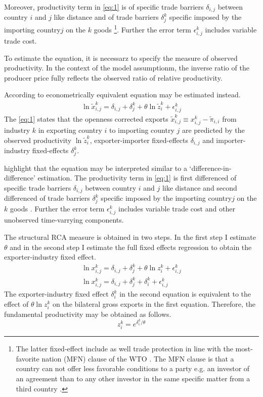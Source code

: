 Moreover, productivity term in \cref{eq:1} is  of specific trade barriers $\delta_{i,j}$ between country $i$ and $j$ like distance and  of trade barriers $\delta_j^k$ specific imposed by the importing country$j$ on the $k$ goods \footnote{The latter fixed-effect include as well  trade protection in line with the most-favorite nation (MFN) clause of the WTO \parencite{costinot}. The MFN clause is that a country can not offer less favorable conditions to a party e.g. an investor of an agreement than to any other investor in the same specific matter from a third country  \parencite{oecd-mfn}.}. Further the error term $\epsilon^k_{i,j}$ includes variable trade cost.
\par
To estimate the equation, it is necessarz to specify the measure of observed productivity.
In the context of the model assumptionm, the inverse ratio of the producer price fully reflects the observed ratio of relative productivity.
\par
According to \textcite{Costinot}  econometrically equivalent equation may be estimated instead.
  \begin{align} \label{eq:1} \ln \tilde{x}_{i,j}^k=\delta_{i,j}+\delta_j^k + \theta \ln\tilde{z}_i^k+\epsilon^k_{i,j} \end{align}
The \cref{eq:1} states that the openness corrected exports  $\tilde{x}_{i,j}^k \equiv x_{i,j}^k -  \tilde{\pi}_{i,i} $ from industry $k$ in exporting country $i$ to importing country $j$ are predicted by the observed productivity $\ln\tilde{z}_i^k$,  exporter-importer fixed-effects $\delta_{i,j}$ and importer-industry fixed-effects $\delta_j^k$. \par \textcite{costinot} highlight that the equation may be interpreted similar  to a `difference-in-difference' estimation.
The productivity term in \cref{eq:1} is first differenced of specific trade barriers $\delta_{i,j}$ between country $i$ and $j$ like distance and second differenced of trade barriers $\delta_j^k$ specific imposed by the importing country$j$ on the $k$ goods . Further the error term $\epsilon^k_{i,j}$ includes variable trade cost and other unobserved time-varrying components. \par
The structural RCA measure is obtained in two steps.
 In the first step I estimate $\theta$ and in the second step I estimate the full fixed effects regression to obtain the exporter-industry fixed effect.
   \begin{align} \label{eq:2}\ln {x}_{i,j}^k=\delta_{i,j}+\delta_j^k + \theta \ln{z}_i^k
+\epsilon^k_{i,j} \\
\ln {x}_{i,j}^k=\delta_{i,j}+\delta_j^k + \delta_i^k + \epsilon^k_{i,j} \end{align}
 The exporter-industry fixed effect $\delta_i^k$ in the second equation is equivalent to the effect of  $\theta \ln{z}_i^k$ on the bilateral gross exports in the first equation. Therefore, the fundamental productivity may be obtained as follows.
  \[ z^k_i=e^{{\delta_i^ k}/{\theta}} \]
